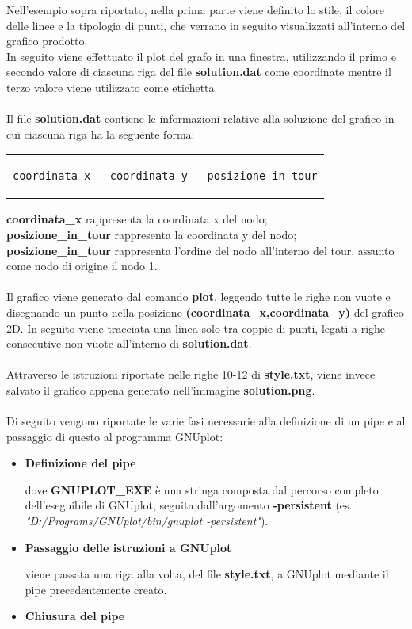 Nell'esempio sopra riportato, nella prima parte viene definito lo stile, il colore delle linee e la tipologia di punti, che verrano in seguito visualizzati all'interno del grafico prodotto.\\In seguito viene effettuato il plot del grafo in una finestra, utilizzando il primo e secondo valore di ciascuna riga del file \textbf{solution.dat} come coordinate mentre il terzo valore viene utilizzato come etichetta.\\\\
Il file \textbf{solution.dat} contiene le informazioni relative alla soluzione del grafico in cui ciascuna riga ha la seguente forma:
\begin{center}
\begin{tabular}{c}
\begin{lstlisting}[linewidth=290pt,basicstyle=\footnotesize\sffamily,]     
coordinata_x   coordinata_y   posizione_in_tour
\end{lstlisting}
\end{tabular}
\end{center}
\textbf{coordinata\_x} rappresenta la coordinata x del nodo;\\
\textbf{posizione\_in\_tour} rappresenta la coordinata y del nodo;\\
\textbf{posizione\_in\_tour} rappresenta l'ordine del nodo all'interno del tour, assunto come nodo di origine il nodo 1.\\\\
Il grafico viene generato dal comando \textbf{plot}, leggendo tutte le righe non vuote e disegnando un punto nella posizione \textbf{(coordinata\_x,coordinata\_y)} del grafico 2D. In seguito viene tracciata una linea solo tra coppie di punti, legati a righe consecutive non vuote all'interno di \textbf{solution.dat}.\\\\
Attraverso le istruzioni riportate nelle righe 10-12 di \textbf{style.txt}, viene invece salvato il grafico appena generato nell'immagine \textbf{solution.png}.\\\\
Di seguito vengono riportate le varie fasi necessarie alla definizione di un pipe e al passaggio di questo al programma GNUplot:
\begin{itemize}
\item{\textbf{Definizione del pipe}

dove \textbf{GNUPLOT\_EXE} è una stringa composta dal percorso completo dell'eseguibile di GNUplot, seguita dall'argomento \textbf{-persistent} (es. \textit{"D:/Programs/GNUplot/bin/gnuplot -persistent"}).
}
\item{\textbf{Passaggio delle istruzioni a GNUplot}

viene passata una riga alla volta, del file \textbf{style.txt}, a GNUplot mediante il pipe precedentemente creato.
}
\item{\textbf{Chiusura del pipe}

}
\end{itemize}